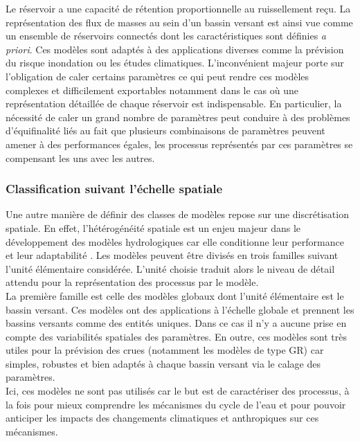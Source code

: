 \noindent Le réservoir a une capacité de rétention proportionnelle au ruissellement reçu. La représentation des flux de masses au sein d'un bassin versant est ainsi vue comme un ensemble de réservoirs connectés dont les caractéristiques sont définies \textit{a priori}. Ces modèles sont adaptés à des applications diverses comme la prévision du risque inondation ou les études climatiques. L'inconvénient majeur porte sur l'obligation de caler certains paramètres ce qui peut rendre ces modèles complexes et difficilement exportables notamment dans le cas où une représentation détaillée de chaque réservoir est indispensable. En particulier, la nécessité de caler un grand nombre de paramètres peut conduire à des problèmes d'équifinalité liés au fait que plusieurs combinaisons de paramètres peuvent amener à des performances égales, les processus représentés par ces paramètres se compensant les uns avec les autres.

\subsubsection{Classification suivant l'échelle spatiale}

Une autre manière de définir des classes de modèles repose sur une discrétisation spatiale. En effet, l'hétérogénéité spatiale est un enjeu majeur dans le développement des modèles hydrologiques car elle conditionne leur performance et leur adaptabilité \citep{bloschl1995}. Les modèles peuvent être divisés en trois familles suivant l'unité élémentaire considérée. L'unité choisie traduit alors le niveau de détail attendu pour la représentation des processus par le modèle.\\

La première famille est celle des modèles globaux dont l'unité élémentaire est le bassin versant. Ces modèles ont des applications à l'échelle globale et prennent les bassins versants comme des entités uniques. Dans ce cas il n'y a aucune prise en compte des variabilités spatiales des paramètres. En outre, ces modèles sont très utiles pour la prévision des crues (notamment les modèles de type GR) car simples, robustes et bien adaptés à chaque bassin versant via le calage des paramètres.\\
Ici, ces modèles ne sont pas utilisés car le but est de caractériser des processus, à la fois pour mieux comprendre les mécanismes du cycle de l'eau et pour pouvoir anticiper les impacts des changements climatiques et anthropiques sur ces mécanismes.\\

